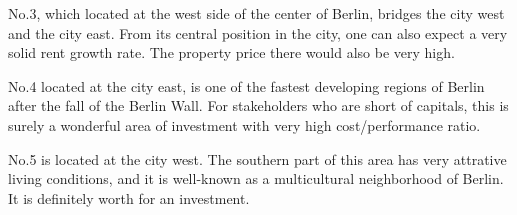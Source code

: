 \documentclass[11pt]{article}
\begin{document}
    No.3, which located at the west side of the center of Berlin, bridges
the city west and the city east. From its central position in the city,
one can also expect a very solid rent growth rate. The property price
there would also be very high.

    No.4 located at the city east, is one of the fastest developing regions
of Berlin after the fall of the Berlin Wall. For stakeholders who are
short of capitals, this is surely a wonderful area of investment with
very high cost/performance ratio.

    No.5 is located at the city west. The southern part of this area has
very attrative living conditions, and it is well-known as a
multicultural neighborhood of Berlin. It is definitely worth for an
investment.


    
    
    
\end{document}
